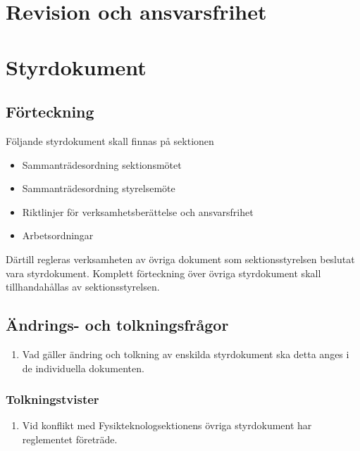 \documentclass[11pt,a4paper]{article}
\begin{document}
\section{Revision och ansvarsfrihet}

\section{Styrdokument}
\subsection{Förteckning}
Följande styrdokument skall finnas på sektionen

\begin{itemize}
\item Sammanträdesordning sektionsmötet
\item Sammanträdesordning styrelsemöte
\item Riktlinjer för verksamhetsberättelse och ansvarsfrihet
\item Arbetsordningar
\end{itemize}

Därtill regleras verksamheten av övriga dokument som sektionsstyrelsen beslutat vara styrdokument. Komplett förteckning över övriga styrdokument skall tillhandahållas av sektionsstyrelsen.

\subsection{Ändrings- och tolkningsfrågor}

\begin{enumerate}[\thesubsection .1]
\item Vad gäller ändring och tolkning av enskilda styrdokument ska detta anges i de individuella dokumenten.

\end{enumerate}

\subsubsection{Tolkningstvister}

\begin{enumerate}[\thesubsection .1]

  \item Vid konflikt med Fysikteknologsektionens övriga styrdokument har reglementet företräde.

\end{enumerate}
\end{document}
